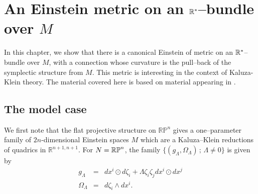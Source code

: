 
\chapter{An Einstein metric on an $\mathbb{R}^*$--bundle over $M$}
\label{chap:KK_lift}
In this chapter, we show that there is a canonical Einstein of metric on an $\mathbb{R}^*$--bundle over $M$, with a connection whose curvature is the pull--back
of the symplectic structure from $M$. This metric is interesting in the context of Kaluza-Klein theory. The material covered here is based on material appearing in \cite{DW}.


\section{The model case} \label{sec:quadric}

We first note that the flat projective structure on $\mathbb{RP}^{n}$ gives a one--parameter family of $2n$-dimensional Einstein spaces $M$ which are a Kaluza--Klein reductions of quadrics in $\mathbb{R}^{n+1,n+1}$. For $N=\mathbb{RP}^n$, the family $\{(g_\Lambda,\Omega_\Lambda)\,;\,\Lambda\neq 0\}$ is given by
\begin{eqnarray}
g_{\Lambda} & = &  dx^{i} \odot d\zeta_{i}+\Lambda\zeta_{i}\zeta_j dx^{i}\odot dx^j \label{eq:g_LambdaModel}\\
\Omega_{\Lambda} & = &  d\zeta_{i}\wedge dx^{i}.\nonumber
\end{eqnarray}

